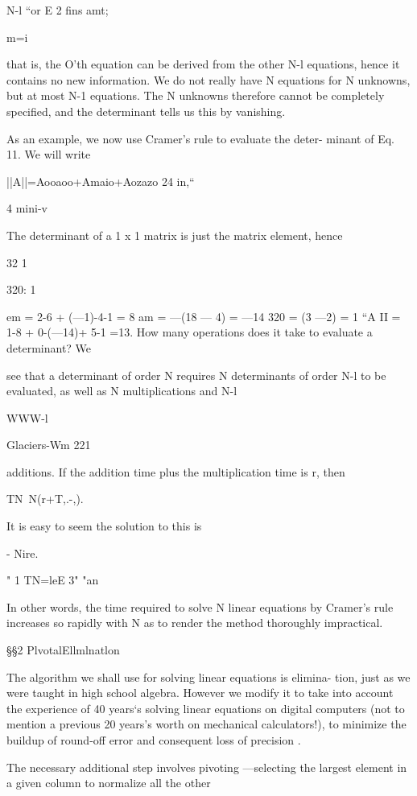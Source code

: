 {N-l
“or E 2 ﬁns amt;

m=i

that is, the O’th equation can be derived from the other N-l
equations, hence it contains no new information. We do not really
have N equations for N unknowns, but at most N-1 equations. The
N unknowns therefore cannot be completely speciﬁed, and the
determinant tells us this by vanishing.

As an example, we now use Cramer’s rule to evaluate the deter-
minant of Eq. 11. We will write

||A||=Aooaoo+Amaio+Aozazo
24
in,“

4
mini-v

The determinant of a 1 x 1 matrix is just the matrix element, hence

32
1

320: 1

 

 

 

em = 2-6 + (—1)-4-1 = 8
am = —(18 — 4) = —14
320 = (3 —2) = 1
“A II = 1-8 + 0-(—14)+ 5-1 =13.
How many operations does it take to evaluate a determinant? We

see that a determinant of order N requires N determinants of
order N-l to be evaluated, as well as N multiplications and N-l

WWW-l

Glaciers-Wm 221

additions. If the addition time plus the multiplication time is r,
then

TN~N(r+T,.-,).

It is easy to seem the solution to this is

- Nire.

" 1
TN=leE 3" "an

In other words, the time required to solve N linear equations by
Cramer’s rule increases so rapidly with N as to render the method
thoroughly impractical.

\S\S2 PlvotalEllmlnatlon

The algorithm we shall use for solving linear equations is elimina-
tion, just as we were taught in high school algebra. However we
modify it to take into account the experience of 40 years‘s solving
linear equations on digital computers (not to mention a previous
20 years's worth on mechanical calculators!), to minimize the
buildup of round-off error and consequent loss of precision .

The necessary additional step involves pivoting —selecting the
largest element in a given column to normalize all the other

}
